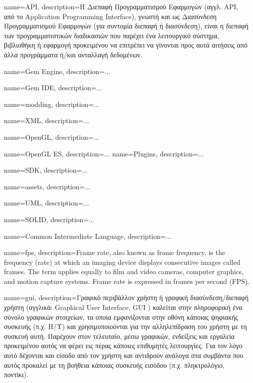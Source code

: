 {
	name=API,
	description={H Διεπαφή Προγραμματισμού Εφαρμογών (αγγλ. API, από το Application Programming Interface), γνωστή και ως Διασύνδεση Προγραμματισμού Εφαρμογών (για συντομία διεπαφή ή διασύνδεση), είναι η διεπαφή των προγραμματιστικών διαδικασιών που παρέχει ένα λειτουργικό σύστημα, βιβλιοθήκη ή εφαρμογή προκειμένου να επιτρέπει να γίνονται προς αυτά αιτήσεις από άλλα προγράμματα ή/και ανταλλαγή δεδομένων.}
}

{
	name=Gem Engine,
	description={...}
}

{
	name=Gem IDE,
	description={...}
}

{
	name=modding,
	description={...}
}

{
	name=XML,
	description={...}
}

{
	name=OpenGL,
	description={...}
}

{
	name=OpenGL ES,
	description={...}
}
{
	name=Plugins,
	description={...}
}

{
	name=SDK,
	description={...}
}

{
	name=assets,
	description={...}
}


{
	name=UML,
	description={...}
}

{
	name=SOLID,
	description={...}
}

{
	name=Common Intermediate Language,
	description={...}
}

{
	name={fps},
	description={Frame rate, also known as frame frequency, is the frequency (rate) at which an imaging device displays consecutive images called frames. The term applies equally to film and video cameras, computer graphics, and motion capture systems. Frame rate is expressed in frames per second (FPS).}
}

{
	name={gui},
	description={Γραφικό περιβάλλον χρήστη ή γραφική διασύνδεση/διεπαφή χρήστη (αγγλικά: Graphical User Interface, GUI ) καλείται στην πληροφορική ένα σύνολο γραφικών στοιχείων, τα οποία εμφανίζονται στην οθόνη κάποιας ψηφιακής συσκευής (π.χ. Η/Υ) και χρησιμοποιούνται για την αλληλεπίδραση του χρήστη με τη συσκευή αυτή. Παρέχουν στον τελευταίο, μέσω γραφικών, ενδείξεις και εργαλεία προκειμένου αυτός να φέρει εις πέρας κάποιες επιθυμητές λειτουργίες. Για τον λόγο αυτό δέχονται και είσοδο από τον χρήστη και αντιδρούν ανάλογα στα συμβάντα που αυτός προκαλεί με τη βοήθεια κάποιας συσκευής εισόδου (π.χ. πληκτρολόγιο, ποντίκι).}		
}

